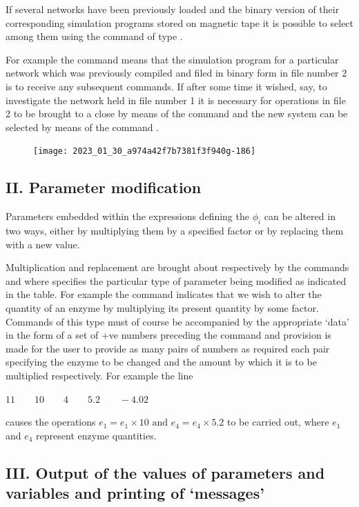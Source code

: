If several networks have been previously loaded and the binary version of their corresponding simulation programs stored on magnetic tape it is possible to select among them using the command of type .

For example the command  means that the simulation program for a particular network which was previously compiled and filed in binary form in file number 2 is to receive any subsequent commands. If after some time it wished, say, to investigate the network held in file number 1 it is necessary for operations in file 2 to be brought to a close by means of the command  and the new system can be selected by means of the command .

\begin{figure}
\texttt{[image: 2023\_01\_30\_a974a42f7b7381f3f940g-186]}
\end{figure}

\subsection*{II. Parameter modification}

Parameters embedded within the expressions defining the $\phi_{i}$ can be altered in two ways, either by multiplying them by a specified factor or by replacing them with a new value.

Multiplication and replacement are brought about respectively by the commands  and  where  specifies the particular type of parameter being modified as indicated in the table. For example the command  indicates that we wish to alter the quantity of an enzyme by multiplying its present quantity by some factor. Commands of this type must of course be accompanied by the appropriate `data' in the form of a set of +ve numbers preceding the command and provision is made for the user to provide as many pairs of numbers as required each pair specifying the enzyme to be changed and the amount by which it is to be multiplied respectively. For example the line

$11\qquad 10\qquad 4\qquad 5.2\qquad -4.02$

causes the operations $e_{1}=e_{1} \times 10 \mbox{ and } e_{4}=e_{4} \times 5.2$ to be carried out, where $e_{1}$ and $e_{4}$ represent enzyme quantities.

\subsection*{III. Output of the values of parameters and variables and printing of `messages'}

